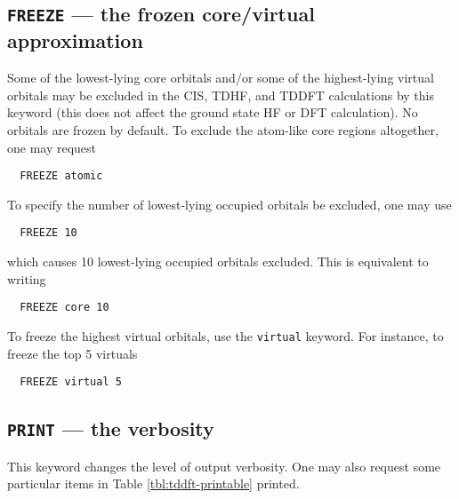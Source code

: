 \subsection{{\tt FREEZE} --- the frozen core/virtual approximation}

Some of the lowest-lying core orbitals and/or some of the highest-lying
virtual orbitals may be excluded in the CIS, TDHF, and TDDFT calculations
by this keyword (this does not affect the ground state HF or DFT calculation).
No orbitals are frozen by default.  To exclude the atom-like
core regions altogether, one may request
\begin{verbatim}
  FREEZE atomic
\end{verbatim}
To specify the number of lowest-lying occupied orbitals be excluded, one may use
\begin{verbatim}
  FREEZE 10
\end{verbatim}
which causes 10 lowest-lying occupied orbitals excluded.
This is equivalent to writing
\begin{verbatim}
  FREEZE core 10
\end{verbatim}
To freeze the highest virtual orbitals, use the \verb+virtual+
keyword.  For instance, to freeze the top 5 virtuals
\begin{verbatim}
  FREEZE virtual 5
\end{verbatim}

\subsection{{\tt PRINT} --- the verbosity}

This keyword changes the level of output verbosity.  One may also
request some particular items in Table \ref{tbl:tddft-printable} printed.

